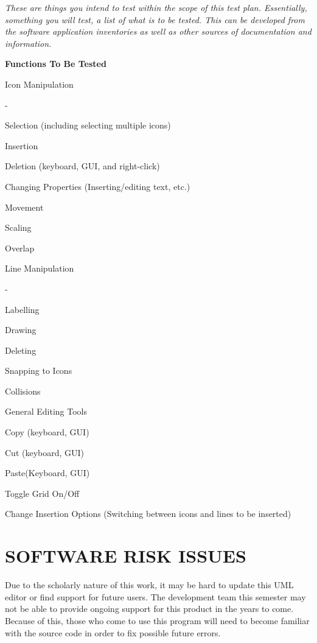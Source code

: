 \documentclass[twoside,letterpaper]{article}
\begin{document}
{\itshape\color{black}
These are things you intend to test within the scope of this test
plan. Essentially, something you will test, a list of what is to be
tested. This can be developed from the software application
inventories as well as other sources of documentation and information.
}

{\color{black}
{\bfseries\color{black} Functions To Be Tested}
\begin{list}{-}{ }
\item Icon Manipulation
\begin{list} {-}{ }
\item Selection (including selecting multiple icons)
\item Insertion
\item Deletion (keyboard, GUI, and right-click)
\item Changing Properties (Inserting/editing text, etc.)
\item Movement
\item Scaling
\item Overlap
\end{list}
\item Line Manipulation
\begin{list} {-}{ }
\item Labelling
\item Drawing
\item Deleting
\item Snapping to Icons
\item Collisions
\end{list}
\item General Editing Tools
\begin{list}{-}{ }
\item Copy (keyboard, GUI)
\item Cut (keyboard, GUI)
\item Paste(Keyboard, GUI)
\item Toggle Grid On/Off
\item Change Insertion Options (Switching between icons and lines to be inserted)
\end{list}
\end{list}

}

\section[SOFTWARE RISK ISSUES]{\bfseries\color{black} SOFTWARE RISK ISSUES}
{\color{black}
Due to the scholarly nature of this work, it may be hard to update this UML editor or find support for future users. The development team this semester may not be able to provide ongoing support for this product in the years to come. Because of this, those who come to use this program will need to become familiar with the source code in order to fix possible future errors.
}
\end{document}
